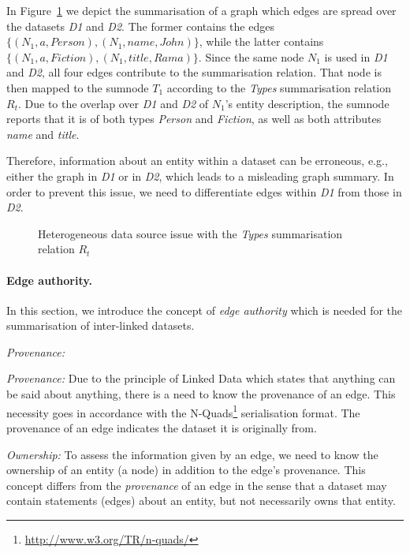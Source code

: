 In Figure~\ref{fig:sum-issue} we depict the summarisation of a graph which edges are spread over the datasets \emph{D1} and \emph{D2}. The former contains the edges $\{ (N_1, a, Person), (N_1, name, John) \}$, while the latter contains $\{ (N_1, a, Fiction), (N_1, title, Rama) \}$. Since the same node $N_1$ is used in \emph{D1} and \emph{D2}, all four edges contribute to the summarisation relation. That node is then mapped to the sumnode $T_1$ according to the \emph{Types} summarisation relation $R_t$.
Due to the overlap over \emph{D1} and \emph{D2} of $N_1$'s entity description, the sumnode reports that it is of both types \emph{Person} and \emph{Fiction}, as well as both attributes \emph{name} and \emph{title}.

Therefore, information about an entity within a dataset can be erroneous, e.g., either the graph in \emph{D1} or in \emph{D2}, which leads to a misleading graph summary.
In order to prevent this issue, we need to differentiate edges within \emph{D1} from those in \emph{D2}.

\begin{figure}
	\centering
	\resizebox{.8\textwidth}{!}{
		
	}
	\caption{Heterogeneous data source issue with the \emph{Types} summarisation relation $R_t$}
	\label{fig:sum-issue}
\end{figure}

\paragraph{Edge authority.}

In this section, we introduce the concept of \emph{edge authority} which is needed for the summarisation of inter-linked datasets.

\begin{labeling}{\emph{Provenance:}}
	\item[\emph{Provenance:}] Due to the principle of Linked Data which states that anything can be said about anything, there is a need to know the provenance of an edge. This necessity goes in accordance with the N-Quads\footnote{\url{http://www.w3.org/TR/n-quads/}} serialisation format. The provenance of an edge indicates the dataset it is originally from.
	
	\item[\emph{Ownership:}] To assess the information given by an edge, we need to know the ownership of an entity (a node) in addition to the edge's provenance. This concept differs from the \emph{provenance} of an edge in the sense that a dataset may contain statements (edges) about an entity, but not necessarily owns that entity.
\end{labeling}

